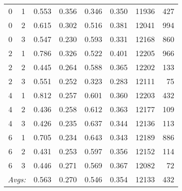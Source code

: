 {\begin{table}
{\begin{tabular}{cc|ccccrr}
0 & 1 & 0.553 & 0.356 & 0.346 & 0.350 & 11936 & 427 \\
0 & 2 & 0.615 & 0.302 & 0.516 & 0.381 & 12041 & 994 \\%
0 & 3 & 0.547 & 0.230 & 0.593 & 0.331 & 12168 & 860 \\ \hline %
2 & 1 & 0.786 & 0.326 & 0.522 & 0.401 & 12205 & 966 \\%
2 & 2 & 0.445 & 0.264 & 0.588 & 0.365 & 12202 & 133 \\%
2 & 3 & 0.551 & 0.252 & 0.323 & 0.283 & 12111 & 75 \\ \hline %
4 & 1 & 0.812 & 0.257 & 0.601 & 0.360 & 12203 & 432 \\%
4 & 2 & 0.436 & 0.258 & 0.612 & 0.363 & 12177 & 109 \\%
4 & 3 & 0.426 & 0.235 & 0.637 & 0.344 & 12136 & 113 \\ \hline %
6 & 1 & 0.705 & 0.234 & 0.643 & 0.343 & 12189 & 886 \\%
6 & 2 & 0.431 & 0.253 & 0.597 & 0.356 & 12152 & 114 \\%
6 & 3 & 0.446 & 0.271 & 0.569 & 0.367 & 12082 & 72 \\ \hline \hline%
 \multicolumn{2}{r|}{\textit{Avgs:}} & 0.563 & 0.270 & 0.546 & 0.354 & 12133 & 432 \\
\end{tabular}
}


\end{table}}
